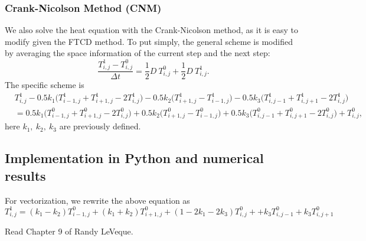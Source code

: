 \documentclass[12pt]{article}
\begin{document}
\subsubsection{Crank-Nicolson Method (CNM)}
We also solve the heat equation with the Crank-Nicolson method, as it is easy to modify given the FTCD method. To put simply, the general scheme is modified by averaging the space information of the current step and the next step:
\begin{equation}
\frac{T^1_{i,j}-T^0_{i,j}}{\Delta t}=\frac{1}{2}D\ T^0_{i,j}+\frac{1}{2}D\ T^1_{i,j}.
\end{equation}
The specific scheme is 
\begin{align}
& T^1_{i,j}-0.5k_1\bigg(T^1_{i-1,j}+T^1_{i+1,j}-2T^1_{i,j}\bigg)-0.5k_2\bigg(T^1_{i+1,j}-T^1_{i-1,j}\bigg)
-0.5k_3\bigg(T^1_{i,j-1}+T^1_{i,j+1}-2T^1_{i,j}\bigg)\nonumber\\
&= 0.5k_1\bigg(T^0_{i-1,j}+T^0_{i+1,j}-2T^0_{i,j}\bigg)+0.5k_2\bigg(T^0_{i+1,j}-T^0_{i-1,j}\bigg)
+0.5k_3\bigg(T^0_{i,j-1}+T^0_{i,j+1}-2T^0_{i,j}\bigg)+T^0_{i,j},
\end{align}
here $k_1,\ k_2,\ k_3$ are previously defined. 



\subsection{Implementation in Python and numerical results}
For vectorization, we rewrite the above equation as 
\begin{equation}
T^1_{i,j}= (k_1-k_2)T^0_{i-1,j}+(k_1+k_2)T^0_{i+1,j}+(1-2k_1-2k_3)T^0_{i,j}+
+k_3T^0_{i,j-1}+k_3T^0_{i,j+1}
\end{equation}

Read Chapter 9 of Randy LeVeque. 


\end{document}
